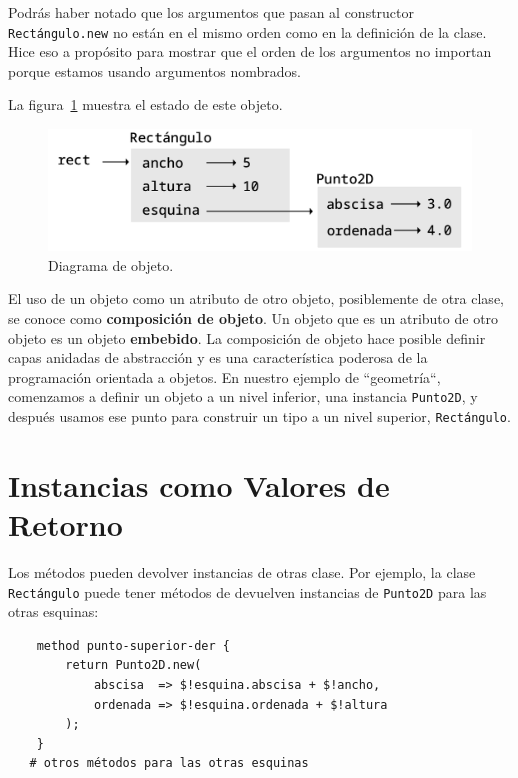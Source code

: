 Podrás haber notado que los argumentos que pasan al 
constructor {\tt Rectángulo.new} no están en el mismo 
orden como en la definición de la clase. Hice eso a 
propósito para mostrar que el orden de los argumentos
no importan porque estamos usando argumentos nombrados.

La figura~\ref{fig.rectangle} muestra el estado de este objeto.

\begin{figure}[h]
\centerline
{\includegraphics[scale=0.7]{figs/rectangle.pdf}}
\caption{Diagrama de objeto.}
\label{fig.rectangle}
\end{figure}


El uso de un objeto como un atributo de otro objeto, posiblemente
de otra clase, se conoce como {\bf composición de objeto}. 
Un objeto que es un atributo de otro objeto es un objeto 
{\bf embebido}. La composición de objeto hace posible 
definir capas anidadas de abstracción y es una característica
poderosa de la programación orientada a objetos. En nuestro 
ejemplo de ``geometría``, comenzamos a definir un objeto 
a un nivel inferior, una instancia {\tt Punto2D}, y después usamos
ese punto para construir un tipo a un nivel superior, {\tt Rectángulo}.


\section{Instancias como Valores de Retorno}

Los métodos pueden devolver instancias de otras clase. 
Por ejemplo, la clase {\tt Rectángulo} puede tener métodos
de devuelven instancias de {\tt Punto2D} para las otras
esquinas:

\begin{verbatim}
    method punto-superior-der {
        return Punto2D.new(
            abscisa  => $!esquina.abscisa + $!ancho, 
            ordenada => $!esquina.ordenada + $!altura
        );
    }
   # otros métodos para las otras esquinas
\end{verbatim}

